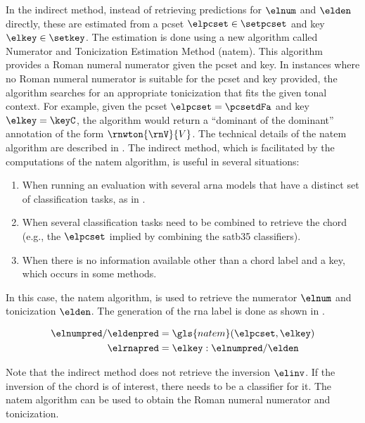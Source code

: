 

In the indirect method, instead of retrieving predictions
for $\elnum$ and $\elden$ directly, these are estimated from
a \gls{pcset} $\elpcset \in \setpcset$ and key $\elkey \in
\setkey$. The estimation is done using a new algorithm
called Numerator and Tonicization Estimation Method
(\gls{natem}). This algorithm provides a Roman numeral
numerator given the \gls{pcset} and key. In instances where
no Roman numeral numerator is suitable for the \gls{pcset}
and key provided, the algorithm searches for an appropriate
tonicization that fits the given tonal context. For example,
given the \gls{pcset} $\elpcset = \pcsetdFa$ and key $\elkey
= \keyC$, the algorithm would return a ``dominant of the
dominant'' annotation of the form $\rnwton{\rnV}{V}$. The
technical details of the \gls{natem} algorithm are described
in . The
indirect method, which is facilitated by the computations of
the \gls{natem} algorithm, is useful in several situations: 

\begin{enumerate}
    \item When running an evaluation with several \gls{arna}
    models that have a distinct set of classification tasks,
    as in .
    \item When several classification tasks need to be
    combined to retrieve the chord (e.g., the $\elpcset$
    implied by combining the \gls{satb35} classifiers).
    \item When there is no information available other than
    a chord label and a key, which occurs in some methods.
\end{enumerate}

In this case, the \gls{natem} algorithm, is used to retrieve
the numerator $\elnum$ and tonicization $\elden$. The
generation of the \gls{rna} label is done as shown in
.

\begin{equation}
    \label{eq:rna_indirect}
    \begin{split}
        \elnumpred / \eldenpred &= \gls{natem}(\elpcset, \elkey) \\
        \elrnapred &= \elkey : \elnumpred / \elden 
    \end{split}
\end{equation}

Note that the indirect method does not retrieve the
inversion $\elinv$. If the inversion of the chord is of
interest, there needs to be a classifier for it. The
\gls{natem} algorithm can be used to obtain the Roman
numeral numerator and tonicization. 


